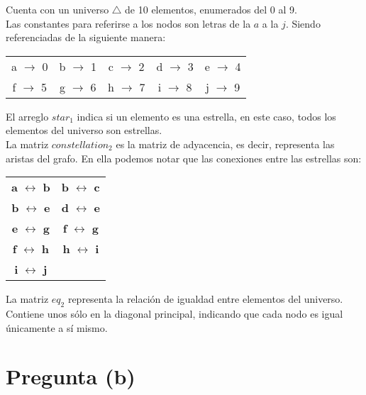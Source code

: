\documentclass[a4paper,11pt]{article}
\begin{document}
\newpage

Cuenta con un universo $\bigtriangleup$ de 10 elementos, enumerados del 0 al 9. \\
Las constantes para referirse a los nodos son letras de la $a$ a la $j$. Siendo referenciadas de la siguiente manera:\\

\begin{center}
    \begin{tabular}{c c c c c}
        a $\rightarrow$ 0 & b $\rightarrow$ 1 & c $\rightarrow$ 2 & d $\rightarrow$ 3 & e $\rightarrow$ 4 \\
        f $\rightarrow$ 5 & g $\rightarrow$ 6 & h $\rightarrow$ 7 & i $\rightarrow$ 8 & j $\rightarrow$ 9 \\
    \end{tabular}
\end{center}

El arreglo $star_1$ indica si un elemento es una estrella, en este caso, todos los elementos del universo son estrellas.\\
La matriz $constellation_2$ es la matriz de adyacencia, es decir, representa las aristas del grafo. En ella podemos notar que las conexiones entre las estrellas son: \\
\begin{center}
    \begin{tabular}{c c}
        \textbf{a} $\leftrightarrow$ \textbf{b} & \textbf{b} $\leftrightarrow$ \textbf{c} \\
        \textbf{b} $\leftrightarrow$ \textbf{e} & \textbf{d} $\leftrightarrow$ \textbf{e} \\
        \textbf{e} $\leftrightarrow$ \textbf{g} & \textbf{f} $\leftrightarrow$ \textbf{g} \\
        \textbf{f} $\leftrightarrow$ \textbf{h} & \textbf{h} $\leftrightarrow$ \textbf{i} \\
        \textbf{i} $\leftrightarrow$ \textbf{j} &                                         \\
    \end{tabular}
\end{center}

La matriz $eq_2$ representa la relación de igualdad entre elementos del universo. Contiene unos sólo en la diagonal principal, indicando que cada nodo es igual únicamente a sí mismo.

\newpage

\section{Pregunta (b)}
\end{document}

